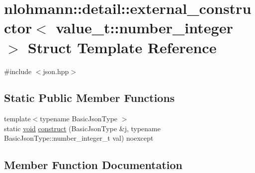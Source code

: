\hypertarget{structnlohmann_1_1detail_1_1external__constructor_3_01value__t_1_1number__integer_01_4}{}\section{nlohmann\+::detail\+::external\+\_\+constructor$<$ value\+\_\+t\+::number\+\_\+integer $>$ Struct Template Reference}
\label{structnlohmann_1_1detail_1_1external__constructor_3_01value__t_1_1number__integer_01_4}


{\ttfamily \#include $<$json.\+hpp$>$}

\subsection*{Static Public Member Functions}
\begin{DoxyCompactItemize}
\item 
{\footnotesize template$<$typename Basic\+Json\+Type $>$ }\\static \mbox{\hyperlink{namespacenlohmann_1_1detail_a59fca69799f6b9e366710cb9043aa77d}{void}} \mbox{\hyperlink{structnlohmann_1_1detail_1_1external__constructor_3_01value__t_1_1number__integer_01_4_a7c3949672ddb45095cc2527635feef0b}{construct}} (Basic\+Json\+Type \&j, typename Basic\+Json\+Type\+::number\+\_\+integer\+\_\+t val) noexcept
\end{DoxyCompactItemize}


\subsection{Member Function Documentation}
\mbox{\label{structnlohmann_1_1detail_1_1external__constructor_3_01value__t_1_1number__integer_01_4_a7c3949672ddb45095cc2527635feef0b}} 
